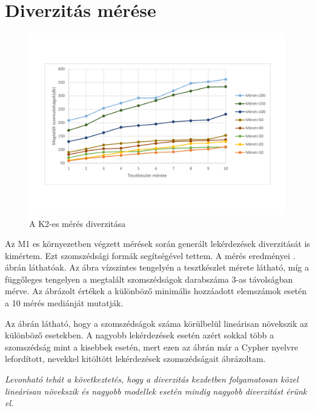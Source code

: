 \section{Diverzitás mérése}


\begin{figure}[htp]
	\centering
	\includegraphics[width=1\textwidth]{figures/diversityB}
	\caption{A K2-es mérés diverzitása}
	\label{fig:BDiversity}
\end{figure}

Az M1 es környezetben végzett mérések során generált lekérdezések diverzitását is kimértem. Ezt szomszédsági formák segítségével tettem. A mérés eredményei . ábrán láthatóak. Az ábra vízszintes tengelyén a tesztkészlet mérete látható, míg a függőleges tengelyen a megtalált szomszédságok darabszáma 3-as távolságban mérve. Az ábrázolt értékek a különböző minimális hozzáadott elemszámok esetén a 10 mérés mediánját mutatják.

Az ábrán látható, hogy a szomszédságok száma körülbelül lineárisan növekszik az különböző esetekben. A nagyobb lekérdezések esetén azért sokkal több a szomszédság mint a kisebbek esetén, mert ezen az ábrán már a Cypher nyelvre lefordított, nevekkel kitöltött lekérdezések szomszédságait ábrázoltam.

\textit{Levonható tehát a következtetés, hogy a diverzitás kezdetben folyamatosan közel lineárisan növekszik és nagyobb modellek esetén mindig nagyobb diverzitást érünk el.}  

